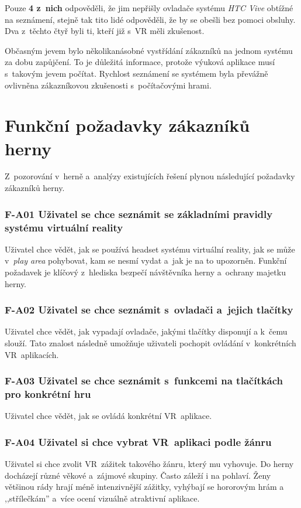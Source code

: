 Pouze \textbf{4 z~nich} odpověděli, že jim nepřišly ovladače systému \emph{HTC
Vive} obtížné na seznámení, stejně tak tito lidé odpověděli, že by se
obešli bez pomoci obsluhy. Dva z~těchto čtyř byli ti, kteří již s~VR
měli zkušenost.

Občasným jevem bylo několikanásobné vystřídání zákazníků na jednom
systému za dobu zapůjčení. To je důležitá informace, protože výuková
aplikace musí s~takovým jevem počítat. Rychlost seznámení se systémem
byla převážně ovlivněna zákazníkovou zkušenosti s~počítačovými hrami.

\section{Funkční požadavky zákazníků
herny}\label{funkux10dnuxed-poux17eadavky-zakazniku-herny}

Z~pozorování v~herně a~analýzy existujících řešení plynou následující
požadavky zákazníků herny.

\subsubsection*{F-A01 Uživatel se chce seznámit se základními pravidly systému
virtuální reality}
Uživatel chce vědět, jak se používá headset systému virtuální reality,
jak se může v~\emph{play area} pohybovat, kam se nesmí vydat a~jak je na
to upozorněn. Funkční požadavek je klíčový z~hlediska bezpečí
návštěvníka herny a~ochrany majetku herny.

\subsubsection*{F-A02 Uživatel se chce seznámit s~ovladači a~jejich tlačítky}
Uživatel chce vědět, jak vypadají ovladače, jakými tlačítky disponují a
k~čemu slouží. Tato znalost následně umožňuje uživateli pochopit ovládání v~konkrétních VR~aplikacích.

\subsubsection*{F-A03 Uživatel se chce seznámit s~funkcemi na tlačítkách pro
konkrétní hru}
Uživatel chce vědět, jak se ovládá konkrétní VR~aplikace.

\subsubsection*{F-A04 Uživatel si chce vybrat VR~aplikaci podle žánru}
Uživatel si chce zvolit VR~zážitek takového žánru, který mu vyhovuje. Do
herny docházejí různé věkové a~zájmové skupiny. Často záleží i na
pohlaví. Ženy většinou rády hrají méně intenzivnější zážitky, vyhýbají
se hororovým hrám a ,,střílečkám'' a~více ocení vizuálně atraktivní
aplikace. \autocite{ladiespreferences}

